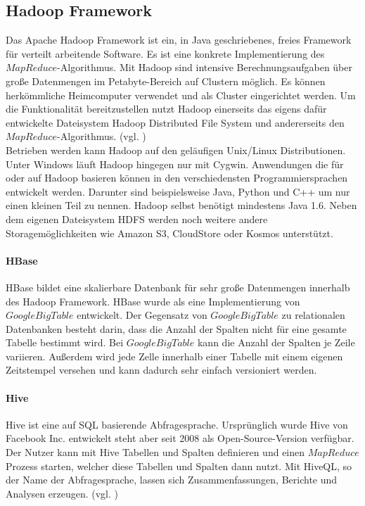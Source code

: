 \subsection{Hadoop Framework}
Das Apache Hadoop Framework ist ein, in Java geschriebenes, freies Framework für verteilt arbeitende Software. Es ist eine konkrete Implementierung des $MapReduce$-Algorithmus. Mit Hadoop sind intensive Berechnungsaufgaben über große Datenmengen im Petabyte-Bereich auf Clustern möglich. Es können herkömmliche Heimcomputer verwendet und als Cluster eingerichtet werden. Um die Funktionalität bereitzustellen nutzt Hadoop einerseits das eigens dafür entwickelte Dateisystem Hadoop Distributed File System und andererseits den $MapReduce$-Algorithmus. (vgl. \cite{wik16})\\ Betrieben werden kann Hadoop auf den geläufigen Unix/Linux Distributionen. Unter Windows läuft Hadoop hingegen nur mit Cygwin. Anwendungen die für oder auf Hadoop basieren können in den verschiedensten Programmiersprachen entwickelt werden. Darunter sind beispielsweise Java, Python und C++ um nur einen kleinen Teil zu nennen. Hadoop selbst benötigt mindestens Java 1.6. Neben dem eigenen Dateisystem HDFS werden noch weitere andere Storagemöglichkeiten wie Amazon S3, CloudStore oder Kosmos unterstützt.

\paragraph{HBase}$\;$ \\
HBase bildet eine skalierbare Datenbank für sehr große Datenmengen innerhalb des Hadoop Framework. HBase wurde als eine Implementierung von $Google BigTable$ entwickelt. Der Gegensatz von $Google BigTable$ zu relationalen Datenbanken besteht darin, dass die Anzahl der Spalten nicht für eine gesamte Tabelle bestimmt wird. Bei $Google BigTable$ kann die Anzahl der Spalten je Zeile variieren. Außerdem wird jede Zelle innerhalb einer Tabelle mit einem eigenen Zeitstempel versehen und kann dadurch sehr einfach versioniert werden.

\paragraph{Hive}$\;$ \\
Hive ist eine auf SQL basierende Abfragesprache. Ursprünglich wurde Hive von Facebook Inc. entwickelt steht aber seit 2008 als Open-Source-Version verfügbar. Der Nutzer kann mit Hive Tabellen und Spalten definieren und einen $MapReduce$ Prozess starten, welcher diese Tabellen und Spalten dann nutzt. Mit HiveQL, so der Name der Abfragesprache, lassen sich Zusammenfassungen, Berichte und Analysen erzeugen. (vgl. \cite{bmc10})

